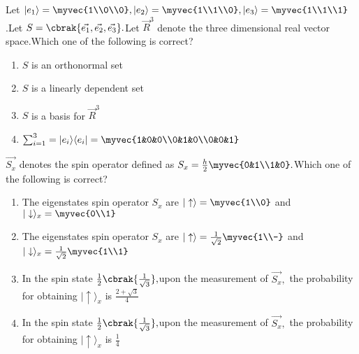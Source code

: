 \iffalse

    \author{EE24BTECH11029}
    \section{ph}
    \chapter{2020}
\fi

\item Let $|e_1\rangle=\myvec{1\\0\\0},|e_2\rangle=\myvec{1\\1\\0},|e_3\rangle=\myvec{1\\1\\1}$.Let $S=\cbrak{\vec{e_1},\vec{e_2},\vec{e_3}}.$Let $\vec{R}^3$ denote the three dimensional real vector space.Which one of the following is correct?
    \begin{enumerate}
        \item $S$ is an orthonormal set
        \item $S$ is a linearly dependent set
        \item $S$ is a basis for $\vec{R}^3$
        \item $\sum_{i=1}^{3}= |e_i\rangle\langle e_i|=\myvec{1&0&0\\0&1&0\\0&0&1}$
    \end{enumerate}
    \item $\vec{S_x}$ denotes the spin operator defined as $S_x=\frac{h}{2}\myvec{0&1\\1&0}.$Which one of the following is correct?
    \begin{enumerate}
        \item The eigenstates spin operator $S_x$ are $|\uparrow\rangle=\myvec{1\\0} $ and $|\downarrow\rangle_x=\myvec{0\\1}$
        \item  The eigenstates spin operator $S_x$ are $|\uparrow\rangle=\frac{1}{\sqrt{2}}\myvec{1\\-} $ and $|\downarrow\rangle_x=\frac{1}{\sqrt{2}}\myvec{1\\1}$
        \item In the spin state $\frac{1}{2}\cbrak{\frac{1}{\sqrt{3}}},$upon the measurement of $\vec{S_x},$ the probability for obtaining $|\uparrow\rangle_x$ is $\frac{2+\sqrt{3}}{4}$
        \item In the spin state $\frac{1}{2}\cbrak{\frac{1}{\sqrt{3}}},$upon the measurement of $\vec{S_x},$ the probability for obtaining $|\uparrow\rangle_x$ is $\frac{1}{4}$
    \end{enumerate}

